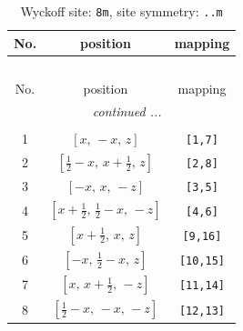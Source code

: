 \documentclass[fleqn,8pt]{jsarticle}
\begin{document}
\begin{longtable}{ccc}
\caption{Wyckoff site: {\tt 8m}, site symmetry: {\tt ..m}}
 \\
 \hline \hline
No. & position & mapping \\ \hline \endfirsthead

\multicolumn{2}{l}{\tablename\ \thetable{}} \\
 \hline \hline
No. & position & mapping \\ \hline \endhead

 \hline \hline
\multicolumn{2}{r}{\footnotesize\it continued ...} \\ \endfoot

 \hline \hline
\multicolumn{2}{r}{} \\ \endlastfoot

1 & $\left[ x,\, - x,\, z \right]$ & {\tt [1,7]} \\ \hline
2 & $\left[ \frac{1}{2} - x,\, x + \frac{1}{2},\, z \right]$ & {\tt [2,8]} \\ \hline
3 & $\left[ - x,\, x,\, - z \right]$ & {\tt [3,5]} \\ \hline
4 & $\left[ x + \frac{1}{2},\, \frac{1}{2} - x,\, - z \right]$ & {\tt [4,6]} \\ \hline
5 & $\left[ x + \frac{1}{2},\, x,\, z \right]$ & {\tt [9,16]} \\ \hline
6 & $\left[ - x,\, \frac{1}{2} - x,\, z \right]$ & {\tt [10,15]} \\ \hline
7 & $\left[ x,\, x + \frac{1}{2},\, - z \right]$ & {\tt [11,14]} \\ \hline
8 & $\left[ \frac{1}{2} - x,\, - x,\, - z \right]$ & {\tt [12,13]} \\
\end{longtable}
\renewcommand{\arraystretch}{1.2}
\end{document}
